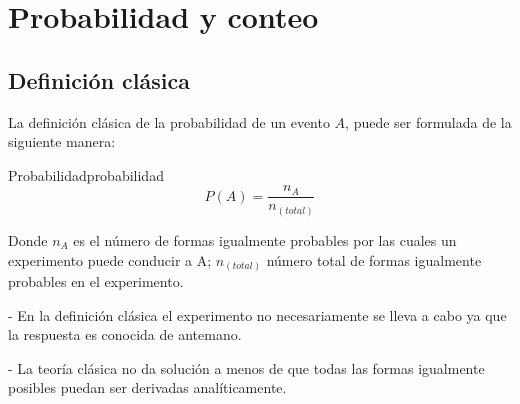 \section{Probabilidad y conteo}

\subsection*{Definici\'on cl\'asica}

La definici\'on cl\'asica de la probabilidad \cite{faber2012statistics} de un
evento $A$, puede ser formulada de la siguiente manera:

\begin{theorem}{Probabilidad}{probabilidad}
    \begin{equation}
        P(A)= \frac{n_A}{n_(total)}
    \end{equation}
\end{theorem}

Donde $n_A$ es el n\'umero de formas igualmente probables por las cuales un
experimento puede conducir a A; $n_(total)$ n\'umero total de formas igualmente
probables en el experimento.

- En la definici\'on cl\'asica el experimento no necesariamente se lleva a cabo
ya que la respuesta es conocida de antemano.

- La teor\'ia cl\'asica no da soluci\'on a menos de que todas las formas
igualmente posibles puedan ser derivadas anal\'iticamente.
